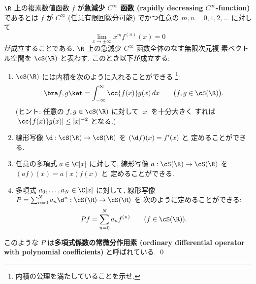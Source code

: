\documentclass[12pt,twoside]{jarticle}
\begin{document}
\begin{question}
\label{q:rapidly-decreasing-Cinfty-function}
  $\R$ 上の複素数値函数 $f$ が{\bf 急減少 $C^\infty$ 函数 (rapidly
  decreasing $C^\infty$-function)} であるとは $f$ が $C^\infty$ 
  (任意有限回微分可能) でかつ任意の $m,n=0,1,2,\ldots$ に対して
  \begin{equation*}
    \lim_{x\to\pm\infty} x^m f^{(n)}(x) = 0
  \end{equation*}
  が成立することである.  $\R$ 上の急減少 $C^\infty$ 函数全体のなす無限次元複
  素ベクトル空間を $\cS(\R)$ と表わす.  このとき以下が成立する:
  \begin{enumerate}
  \item $\cS(\R)$ には内積を次のように入れることができる%
    \footnote{内積の公理を満たしていることを示せ.}:
    \begin{equation*}
      \bra f,g\ket = \int_{-\infty}^\infty \cc{f(x)}g(x)\,dx
      \qquad
      \bigl(f,g\in\cS(\R)\bigr).
    \end{equation*}
    (ヒント: 任意の $f,g\in\cS(\R)$ に対して $|x|$ を十分大きく
    すれば $\left|\cc{f(x)}g(x)\right|\le |x|^{-2}$ となる.)
  \item 線形写像 $\d:\cS(\R)\to\cS(\R)$ を $(\d f)(x) = f'(x)$ と
    定めることができる.
  \item 任意の多項式 $a\in\C[x]$ に対して, 
    線形写像 $a:\cS(\R)\to\cS(\R)$ を $(af)(x)=a(x)f(x)$ と
    定めることができる.
  \item 多項式 $a_0,\dots,a_N\in\C[x]$ に対して,
    線形写像 $P=\sum_{n=0}^N a_n \d^n:\cS(\R)\to\cS(\R)$ を
    次のように定めることができる: 
    \begin{equation*}
      Pf = \sum_{n=0}^N a_n f^{(n)}
      \qquad (f\in\cS(\R)).
    \end{equation*}
  \end{enumerate}
  このような $P$ は{\bf 多項式係数の常微分作用素 (ordinary differential
  operator with polynomial coefficients)} と呼ばれている. 
  \qed
\end{question}

\end{document}
